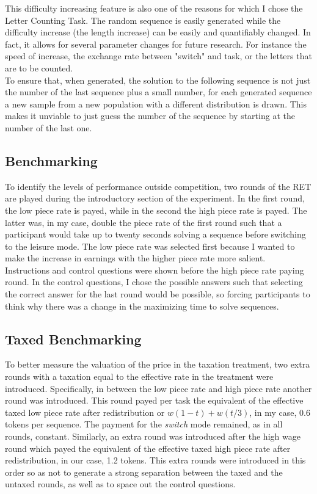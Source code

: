     This difficulty increasing feature is also one of the reasons for which I chose the Letter Counting Task. The random sequence is easily generated while the difficulty increase (the length increase) can be easily and quantifiably changed. In fact, it allows for several parameter changes for future research. For instance the speed of increase, the exchange rate between "switch" and task, or the letters that are to be counted.\\
    
    To ensure that, when generated, the solution to the following sequence is not just the number of the last sequence plus a small number, for each generated sequence a new sample from a new population with a different distribution is drawn. This makes it unviable to just guess the number of the sequence by starting at the number of the last one.
    
    \subsection{Benchmarking}
    
    To identify the levels of performance outside competition, two rounds of the RET are played during the introductory section of the experiment. In the first round, the low piece rate is payed, while in the second the high piece rate is payed. The latter was, in my case, double the piece rate of the first round such that a participant would take up to twenty seconds solving a sequence before switching to the leisure mode. The low piece rate was selected first because I wanted to make the increase in earnings with the higher piece rate more salient.\\
    
    Instructions and control questions were shown before the high piece rate paying round. In the control questions, I chose the possible answers such that selecting the correct answer for the last round would be possible, so forcing participants to think why there was a change in the maximizing time to solve sequences.
    
    \subsection{Taxed Benchmarking}
    
    To better measure the valuation of the price in the taxation treatment, two extra rounds with a taxation equal to the effective rate in the treatment were introduced. Specifically, in between the low piece rate and high piece rate another round was introduced. This round payed per task the equivalent of the effective taxed low piece rate after redistribution or $w(1-t)+ w(t/3)$, in my case, 0.6 tokens per sequence. The payment for the \textit{switch} mode remained, as in all rounds, constant. Similarly, an extra round was introduced after the high wage round which payed the equivalent of the effective taxed high piece rate after redistribution, in our case, 1.2 tokens. This extra rounds were introduced in this order so as not to generate a strong separation between the taxed and the untaxed rounds, as well as to space out the control questions. \\ 
    
